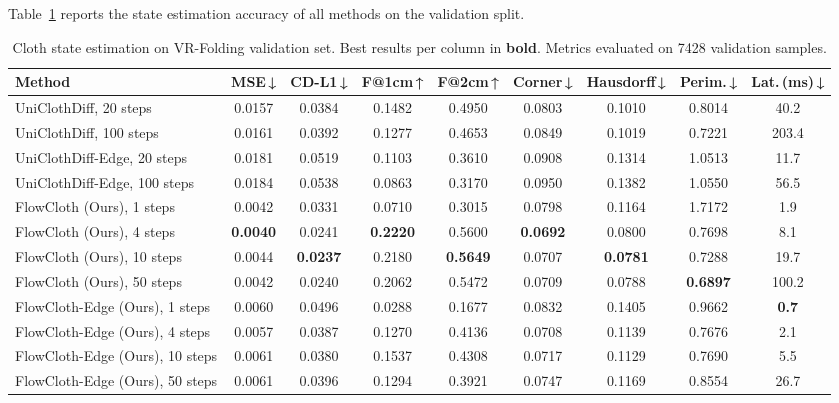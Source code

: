\documentclass{article}
\begin{document}
Table~\ref{tab:state_est} reports the state estimation accuracy of all methods on the validation split.
\begin{table}[htb!]
  \centering
  \caption{Cloth state estimation on VR-Folding validation set.
            Best results per column in \textbf{bold}.
            Metrics evaluated on 7428 validation samples.}
  \label{tab:state_est}
  \setlength{\tabcolsep}{5pt}
  \begin{adjustbox}{tabular, center}
  \begin{tabular}{l c c c c c c c c}
    \toprule
    \textbf{Method} &
    \textbf{MSE\,↓} &
    \textbf{CD-L1\,↓} &
    \textbf{F@1cm\,↑} &
    \textbf{F@2cm\,↑} &
    \textbf{Corner\,↓} &
    \textbf{Hausdorff\,↓} &
    \textbf{Perim.\,↓} &
    \textbf{Lat.\,(ms)\,↓} \\
    \midrule
    UniClothDiff, 20 steps & 0.0157 & 0.0384 & 0.1482 & 0.4950 & 0.0803 & 0.1010 & 0.8014 & 40.2 \\
    UniClothDiff, 100 steps & 0.0161 & 0.0392 & 0.1277 & 0.4653 & 0.0849 & 0.1019 & 0.7221 & 203.4 \\
    UniClothDiff-Edge, 20 steps & 0.0181 & 0.0519 & 0.1103 & 0.3610 & 0.0908 & 0.1314 & 1.0513 & 11.7 \\
    UniClothDiff-Edge, 100 steps & 0.0184 & 0.0538 & 0.0863 & 0.3170 & 0.0950 & 0.1382 & 1.0550 & 56.5 \\
    \midrule
    FlowCloth (Ours), 1 steps & 0.0042 & 0.0331 & 0.0710 & 0.3015 & 0.0798 & 0.1164 & 1.7172 & 1.9 \\
    FlowCloth (Ours), 4 steps & \textbf{0.0040} & 0.0241 & \textbf{0.2220} & 0.5600 & \textbf{0.0692} & 0.0800 & 0.7698 & 8.1 \\
    FlowCloth (Ours), 10 steps & 0.0044 & \textbf{0.0237} & 0.2180 & \textbf{0.5649} & 0.0707 & \textbf{0.0781} & 0.7288 & 19.7 \\
    FlowCloth (Ours), 50 steps & 0.0042 & 0.0240 & 0.2062 & 0.5472 & 0.0709 & 0.0788 & \textbf{0.6897} & 100.2 \\
    FlowCloth-Edge (Ours), 1 steps & 0.0060 & 0.0496 & 0.0288 & 0.1677 & 0.0832 & 0.1405 & 0.9662 & \textbf{0.7} \\
    FlowCloth-Edge (Ours), 4 steps & 0.0057 & 0.0387 & 0.1270 & 0.4136 & 0.0708 & 0.1139 & 0.7676 & 2.1 \\
    FlowCloth-Edge (Ours), 10 steps & 0.0061 & 0.0380 & 0.1537 & 0.4308 & 0.0717 & 0.1129 & 0.7690 & 5.5 \\
    FlowCloth-Edge (Ours), 50 steps & 0.0061 & 0.0396 & 0.1294 & 0.3921 & 0.0747 & 0.1169 & 0.8554 & 26.7 \\
    \bottomrule
  \end{tabular}
  \end{adjustbox}
\end{table}
\end{document}
